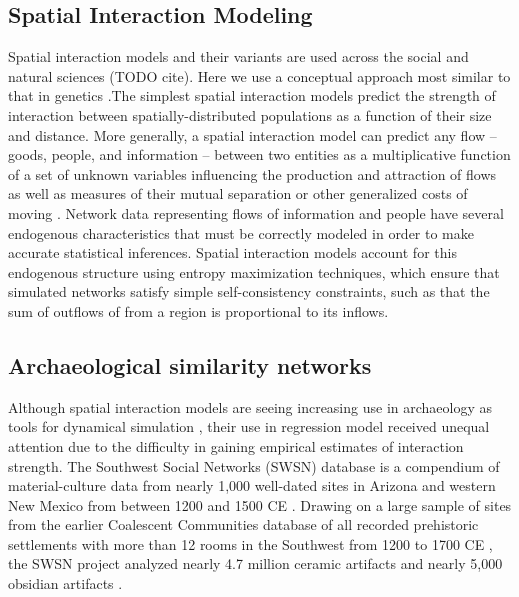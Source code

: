 \documentclass[10pt]{iopart}
\begin{document}
\subsection*{Spatial Interaction Modeling}
Spatial interaction models and their variants are used across the social and natural sciences (TODO cite). Here we use a conceptual approach most similar to that in genetics \parencite{Murphy2010}.The simplest spatial interaction models predict the strength of interaction between spatially-distributed populations as a function of their size and distance. More generally, a spatial interaction model can predict any flow -- goods, people, and information -- between two entities as a multiplicative function of a set of unknown variables influencing the production and attraction of flows as well as measures of their mutual separation or other generalized costs of moving \parencite{sen and smith,fotheringham}. Network data representing flows of information and people have several endogenous characteristics that must be correctly modeled in order to make accurate statistical inferences. Spatial interaction models account for this endogenous structure using entropy maximization techniques, which ensure that simulated networks satisfy simple self-consistency constraints, such as that the sum of outflows of from a region is proportional to its inflows.


\subsection*{Archaeological similarity networks}
Although spatial interaction models are seeing increasing use in archaeology as tools for dynamical simulation \parencite{bevanwilson2011, riversevans}, their use in regression model received unequal attention \parencite{Johnson1990ChumashAnalysis,cappadocianspeculation,Hodder1974} due to the difficulty in gaining empirical estimates of interaction strength. The Southwest Social Networks (SWSN) database is a compendium of material-culture data from nearly 1,000 well-dated sites in Arizona and western New Mexico from between 1200 and 1500 CE \parencite{Mills2012,Mills2013a,Peeples2013,Borck2015,Hill2015,Mills2015a}. Drawing on a large sample of sites from the earlier Coalescent Communities database of all recorded prehistoric settlements with more than 12 rooms in the Southwest from 1200 to 1700 CE \parencite{Hill2004}, the SWSN project analyzed nearly 4.7 million ceramic artifacts and nearly 5,000 obsidian artifacts \parencite{Mills2015a}.
\end{document}
